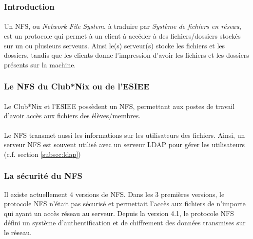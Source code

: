 \subsubsection*{Introduction}

\paragraph{} Un NFS, ou \textit{Network File System}, à traduire par
\textit{Système de fichiers en réseau}, est un protocole qui permet à un client
à accéder à des fichiers/dossiers stockés sur un ou plusieurs serveurs. Ainsi
le(s) serveur(s) stocke les fichiers et les dossiers, tandis que les clients
donne l'impression d'avoir les fichiers et les dossiers présents sur la
machine.

\subsubsection*{Le NFS du Club*Nix ou de l'ESIEE}

\paragraph{} Le Club*Nix et l'ESIEE possèdent un NFS, permettant aux postes de
travail d'avoir accès aux fichiers des élèves/membres.

\paragraph{} Le NFS transmet aussi les informations sur les utilisateurs des
fichiers. Ainsi, un serveur NFS est souvent utilisé avec un serveur LDAP pour
gérer les utilisateurs (c.f. section \ref{subsec:ldap})

\subsubsection*{La sécurité du NFS}

Il existe actuellement 4 versions de NFS. Dans les 3 premières versions, le
protocole NFS n'était pas sécurisé et permettait l'accès aux fichiers de
n'importe qui ayant un accès réseau au serveur. Depuis la version 4.1, le
protocole NFS défini un système d'authentification et de chiffrement des
données transmises sur le réseau.
